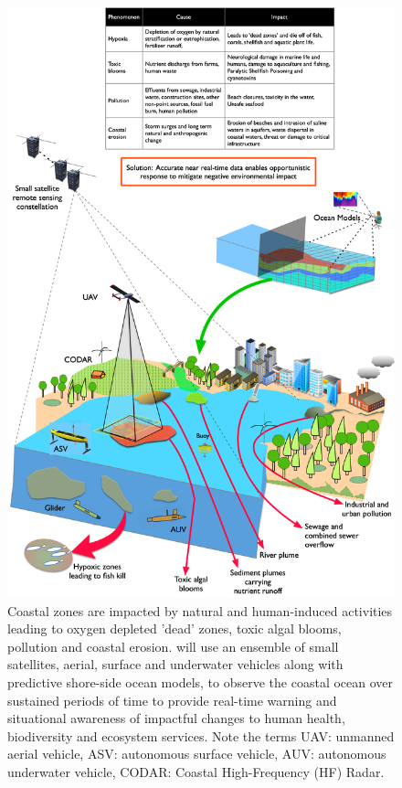 \documentclass[12pt]{article}
\begin{document}
\begin{figure}[H]
  \centering
  \includegraphics[scale=0.115]{fig/mega-cities-toxic-1.jpg}
  \caption{Coastal zones are impacted by natural and human-induced
    activities leading to oxygen depleted 'dead' zones, toxic algal
    blooms, pollution and coastal erosion. \pro will use an ensemble
    of small satellites, aerial, surface and underwater vehicles along
    with predictive shore-side ocean models, to observe the coastal
    ocean over sustained periods of time to provide real-time warning
    and situational awareness of impactful changes to human health,
    biodiversity and ecosystem services. Note the terms UAV: unmanned
    aerial vehicle, ASV: autonomous surface vehicle, AUV: autonomous
    underwater vehicle, CODAR: Coastal High-Frequency (HF) Radar.}
    \label{fig:mega-cities}
\end{figure}
\end{document}
